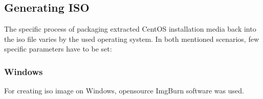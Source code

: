 \documentclass[
  printed, %
  table,   %
  lof,     %
  lot,     %
           oneside, color
]{fithesis3}
\renewcommand{\texttt}[1]{%
  \begingroup
  \ttfamily
  \begingroup\lccode`~=`/\lowercase{\endgroup\def~}{/\discretionary{}{}{}}%
  \begingroup\lccode`~=`[\lowercase{\endgroup\def~}{[\discretionary{}{}{}}%
  \begingroup\lccode`~=`.\lowercase{\endgroup\def~}{.\discretionary{}{}{}}%
  \catcode`/=\active\catcode`[=\active\catcode`.=\active
  \scantokens{#1\noexpand}%
  \endgroup
}
\begin{document}
\subsection{Generating ISO}
The specific process of packaging extracted CentOS installation media back into the iso file varies by the used operating system. In both mentioned scenarios, few specific parameters have to be set:
\subsubsection{Windows}
For creating iso image on Windows, opensource ImgBurn software was used. 
\end{document}
